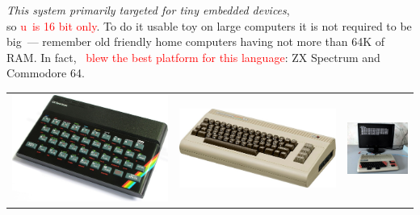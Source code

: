 \clearpage{}

\emph{This system primarily targeted for tiny embedded devices},\\
so \textcolor{red}{u\F\ is 16 bit only}. To do it usable toy on large
computers it is not
required to be big\ --- remember old friendly home computers having not more
than 64K of RAM. In fact, \textcolor{red}{\F\ blew the best platform for
this language}: ZX Spectrum and Commodore 64.

\smallskip\noindent
\begin{tabular}{l l l}
\includegraphics[height=0.35\textheight]{img/ZX48.jpg} &
\includegraphics[height=0.35\textheight]{img/C64.jpg} &
\includegraphics[height=0.35\textheight]{img/microsha.jpg} \\
\end{tabular}
\clearpage


